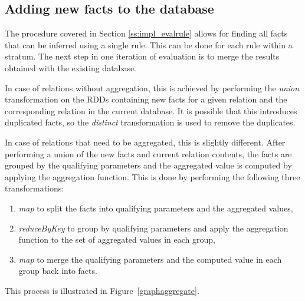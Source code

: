 \subsection{Adding new facts to the database}\label{ss:impl_merge}

The procedure covered in Section \ref{ss:impl_evalrule} allows for finding all facts that can be inferred using a single rule. This can be done for each rule within a stratum. The next step in one iteration of evaluation is to merge the results obtained with the existing database.

In case of relations without aggregation, this is achieved by performing the \emph{union} transformation on the RDDs containing new facts for a given relation and the corresponding relation in the current database. It is possible that this introduces duplicated facts, so the \emph{distinct} transformation is used to remove the duplicates.

In case of relations that need to be aggregated, this is slightly different. After performing a union of the new facts and current relation contents, the facts are grouped by the qualifying parameters and the aggregated value is computed by applying the aggregation function. This is done by performing the following three transformations:
\begin{enumerate}
\item \emph{map} to split the facts into qualifying parameters and the aggregated values,
\item \emph{reduceByKey} to group by qualifying parameters and apply the aggregation function to the set of aggregated values in each group,
\item \emph{map} to merge the qualifying parameters and the computed value in each group back into facts.
\end{enumerate}
This process is illustrated in Figure~\ref{graphaggregate}.


